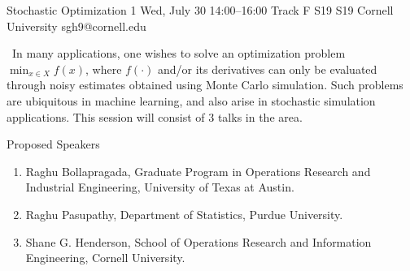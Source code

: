 \begin{talk}
  {Stochastic Optimization}%
  {1}%
  {}%
  {}%
  {}%
  {}%
  {Wed, July 30 14:00–16:00 Track F}%
  {S19}%
  {S19}%
  {%
    {Cornell University}%
    {sgh9@cornell.edu}}%

~In many applications, one wishes to solve an optimization problem
$\min_{x \in X} f(x)$, where $f(\cdot)$ and/or its derivatives can
only be evaluated through noisy estimates obtained using Monte Carlo
simulation. Such problems are ubiquitous in machine learning, and also
arise in stochastic simulation applications. This session will consist
of 3 talks in the area.

Proposed Speakers
\begin{enumerate}
\item Raghu Bollapragada, Graduate Program in Operations Research and Industrial Engineering, University of Texas
  at Austin.
\item Raghu Pasupathy, Department of Statistics, Purdue University.
\item Shane G. Henderson, School of Operations Research and Information
    Engineering, Cornell University.
\end{enumerate}

\medskip



\end{talk}

